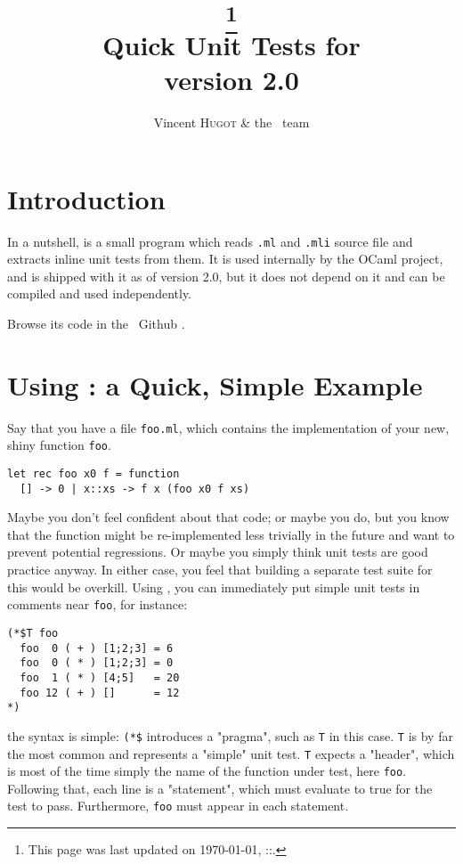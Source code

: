 \documentclass[a4paper,12pt]{article}
\title{\Large{\qtest}\footnote{
  This page was last updated on \today, \thehour:\theminute:\thesecond.}\\
Quick Unit Tests for \OCaml\\
version 2.0
}
\author{Vincent \textsc{Hugot} \& the \bat\ team}
\begin{document}
\maketitle
\tableofcontents

\section{Introduction}

In a nutshell, \qtest{} is a small program which reads \texttt{.ml} and \texttt{.mli} source file and
extracts inline \ounit{} unit tests from them. It is used internally by the OCaml
\bat{} project, and is shipped with it as of version 2.0, but it does not depend on
it and can be compiled and used independently.

Browse its code in the \bat\ Github
.



\section{Using \qtest{} : a Quick, Simple Example}

Say that you have a file \texttt{foo.ml}, which contains the implementation of your new, shiny
function \texttt{foo}.

\begin{verbatim}
let rec foo x0 f = function
  [] -> 0 | x::xs -> f x (foo x0 f xs)
\end{verbatim}


Maybe you don't feel confident about that code; or maybe you do, but you know that the
function might be re-implemented less trivially in the future and want to prevent
potential regressions. Or maybe you simply think unit tests are good practice anyway. In
either case, you feel that building a separate test suite for this would be overkill.
Using \qtest{}, you can immediately put simple unit tests in comments near \texttt{foo}, for
instance:

\begin{verbatim}
(*$T foo
  foo  0 ( + ) [1;2;3] = 6
  foo  0 ( * ) [1;2;3] = 0
  foo  1 ( * ) [4;5]   = 20
  foo 12 ( + ) []      = 12
*)
\end{verbatim} 

the syntax is simple: \texttt{(*\$} introduces a \qtest{} "pragma", such as \texttt{T} in this case. \texttt{T}
is by far the most common and represents a "simple" unit test. \texttt{T} expects a "header",
which is most of the time simply the name of the function under test, here \texttt{foo}.
Following that, each line is a "statement", which must evaluate to true for the test to
pass. Furthermore, \texttt{foo} must appear in each statement.
\end{document}
